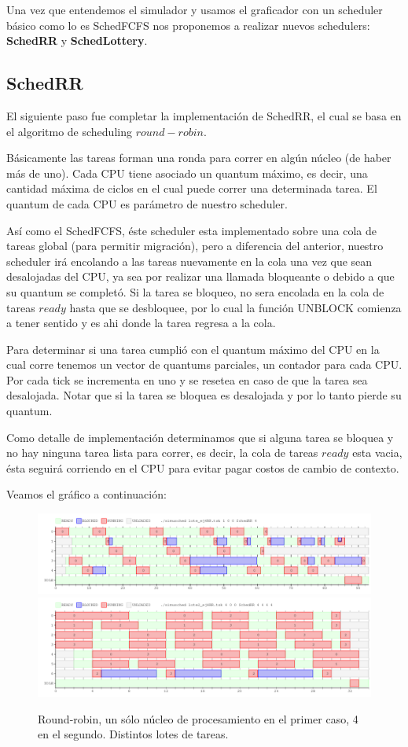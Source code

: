 Una vez que entendemos el simulador y usamos el graficador con un scheduler básico como lo es SchedFCFS nos proponemos a realizar nuevos schedulers: \textbf{SchedRR} y \textbf{SchedLottery}.

\subsection{SchedRR}

El siguiente paso fue completar la implementación de SchedRR, el cual se basa en el algoritmo de scheduling $round-robin$. 

Básicamente las tareas forman una ronda para correr en algún núcleo (de haber más de uno). Cada CPU tiene asociado un quantum máximo, es decir, una cantidad máxima de ciclos en el cual puede correr una determinada tarea. El quantum de cada CPU es parámetro de nuestro scheduler.

Así como el SchedFCFS, éste scheduler esta implementado sobre una cola de tareas global (para permitir migración), pero a diferencia del anterior, nuestro scheduler irá encolando a las tareas nuevamente en la cola una vez que sean desalojadas del CPU, ya sea por realizar una llamada bloqueante o debido a que su quantum se completó. Si la tarea se bloqueo, no sera encolada en la cola de tareas $ready$ hasta que se desbloquee, por lo cual la función UNBLOCK comienza a tener sentido y es ahi donde la tarea regresa a la cola.

Para determinar si una tarea cumplió con el quantum máximo del CPU en la cual corre tenemos un vector de quantums parciales, un contador para cada CPU. Por cada tick se incrementa en uno y se resetea en caso de que la tarea sea desalojada. Notar que si la tarea se bloquea es desalojada y por lo tanto pierde su quantum.

Como detalle de implementación determinamos que si alguna tarea se bloquea y no hay ninguna tarea lista para correr, es decir, la cola de tareas $ready$ esta vacia, ésta seguirá corriendo en el CPU para evitar pagar costos de cambio de contexto.

Veamos el gráfico a continuación:

\begin{figure}[H]
\centering\includegraphics[width=15 cm]{graficos/ej4RR1.png}
\centering\includegraphics[width=15 cm]{graficos/ej4RR2.png}
\caption{Round-robin, un sólo núcleo de procesamiento en el primer caso, 4 en el segundo. Distintos lotes de tareas.}
\end{figure}

